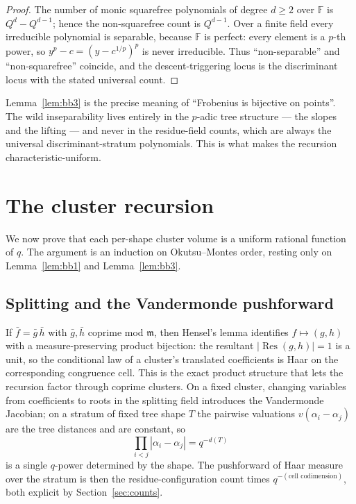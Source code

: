 \documentclass[pdflatex,sn-mathphys-num]{sn-jnl}%
\DeclareMathOperator{\Res}{Res}
\newcommand{\bbF}{\mathbb{F}}
\newcommand{\fkm}{\mathfrak{m}}
\theoremstyle{plain}
\theoremstyle{definition}
\theoremstyle{remark}
\numberwithin{equation}{section}
\begin{document}
\begin{proof}
The number of monic squarefree polynomials of degree $d\ge2$ over $\bbF$ is
$Q^{d}-Q^{d-1}$; hence the non-squarefree count is $Q^{d-1}$. Over a finite field
every irreducible polynomial is separable, because $\bbF$ is perfect: every
element is a $p$-th power, so $y^{p}-c=(y-c^{1/p})^{p}$ is never irreducible. Thus
``non-separable'' and ``non-squarefree'' coincide, and the descent-triggering
locus is the discriminant locus with the stated universal count.
\end{proof}

Lemma~\ref{lem:bb3} is the precise meaning of ``Frobenius is bijective on
points''. The wild inseparability lives entirely in the $p$-adic tree structure
--- the slopes and the lifting --- and never in the residue-field counts, which
are always the universal discriminant-stratum polynomials. This is what makes the
recursion characteristic-uniform.

\section{The cluster recursion}\label{sec:recursion}

We now prove that each per-shape cluster volume is a uniform rational function of
$q$. The argument is an induction on Okutsu--Montes order, resting only on
Lemma~\ref{lem:bb1} and Lemma~\ref{lem:bb3}.

\subsection{Splitting and the Vandermonde pushforward}\label{sec:split}

If $\bar f=\bar g\,\bar h$ with $\bar g,\bar h$ coprime mod $\fkm$, then Hensel's
lemma identifies $f\mapsto(g,h)$ with a measure-preserving product bijection: the
resultant $|\Res(g,h)|=1$ is a unit, so the conditional law of a cluster's
translated coefficients is Haar on the corresponding congruence cell. This is the
exact product structure that lets the recursion factor through coprime clusters.
On a fixed cluster, changing variables from coefficients to roots in the splitting
field introduces the Vandermonde Jacobian; on a stratum of fixed tree shape $T$
the pairwise valuations $v(\alpha_{i}-\alpha_{j})$ are the tree distances and are
constant, so
\[
  \prod_{i<j}|\alpha_{i}-\alpha_{j}|=q^{-d(T)}
\]
is a single $q$-power determined by the shape. The pushforward of Haar measure
over the stratum is then the residue-configuration count times $q^{-(\text{cell
codimension})}$, both explicit by Section~\ref{sec:counts}.
\end{document}

